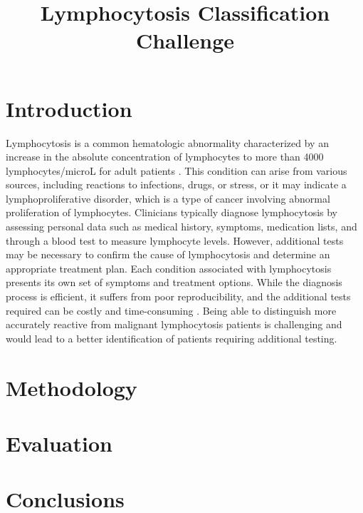 \documentclass{midl}
\title[DLMI]{Lymphocytosis Classification Challenge}
\begin{document}
\maketitle

\begin{abstract}
\end{abstract}

\section{Introduction}
\label{sec:introduction}

Lymphocytosis is a common hematologic abnormality characterized by an increase in the absolute concentration of lymphocytes to more than 4000 lymphocytes/microL for adult patients \cite{Hamad_2023}. This condition can arise from various sources, including reactions to infections, drugs, or stress, or it may indicate a lymphoproliferative disorder, which is a type of cancer involving abnormal proliferation of lymphocytes. Clinicians typically diagnose lymphocytosis by assessing personal data such as medical history, symptoms, medication lists, and through a blood test to measure lymphocyte levels. However, additional tests may be necessary to confirm the cause of lymphocytosis and determine an appropriate treatment plan. Each condition associated with lymphocytosis presents its own set of symptoms and treatment options. While the diagnosis process is efficient, it suffers from poor reproducibility, and the additional tests required can be costly and time-consuming \cite{Sahasrabudhe_2021}. Being able to distinguish more accurately reactive from malignant lymphocytosis patients is challenging and would lead to a better identification of patients requiring additional testing.

\section{Methodology}
\label{sec:methodology}

\section{Evaluation}
\label{sec:evaluation}

\section{Conclusions}
\label{sec:conclusion}

\newpage

\end{document}
